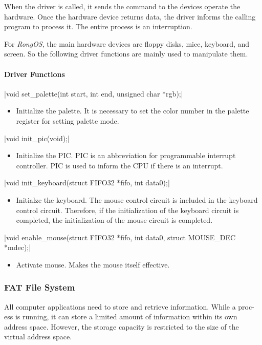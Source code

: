 \documentclass{swfcthesis}
\begin{document}
When the driver is called, it sends the command to the devices operate the hardware. Once
the hardware device returns data, the driver informs the calling program to process
it. The entire process is an interruption.

For \emph{RongOS}, the main hardware devices are floppy disks, mice, keyboard, and
screen. So the following driver functions are mainly used to manipulate them.

\paragraph{Driver Functions}

\csingle|void set_palette(int start, int end, unsigned char *rgb);|
\begin{itemize}
\item Initialize the palette. It is necessary to set the color number in the palette
  register for setting palette mode. 
\end{itemize}

\csingle|void init_pic(void);|
\begin{itemize}
\item Initialize the PIC. PIC is an abbreviation for programmable interrupt
  controller. PIC is used to inform the CPU if there is an interrupt. 
  
  
\end{itemize}

\csingle|void init_keyboard(struct FIFO32 *fifo, int data0);|
\begin{itemize}
\item Initialze the keyboard. The mouse control circuit is included in the keyboard
  control circuit. Therefore, if the initialization of the keyboard circuit is completed,
  the initialization of the mouse circuit is completed.
  
\end{itemize}

\csingle|void enable_mouse(struct FIFO32 *fifo, int data0, struct MOUSE_DEC *mdec);|
\begin{itemize}
\item Activate mouse. Makes the mouse itself effective.
\end{itemize}

\subsubsection{FAT File System}
\label{sec:fat}
All computer applications need to store and retrieve information. While a proc-
ess is running, it can store a limited amount of information within its own address
space. However, the storage capacity is restricted to the size of the virtual address
space\cite{tanenbaum2009modern}.
\end{document}
